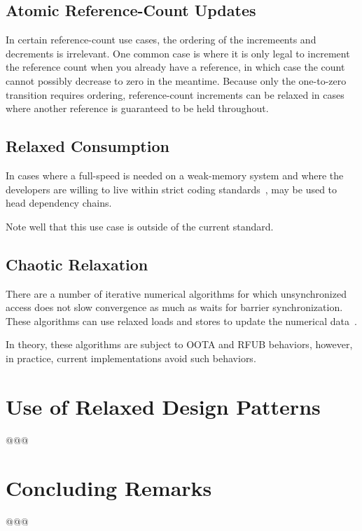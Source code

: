 \documentclass{article}
\begin{document}
\subsection{Atomic Reference-Count Updates}
\label{sec:Atomic Reference-Count Updates}

In certain reference-count use cases, the ordering of the incremeents and
decrements is irrelevant.
One common case is where it is only legal to increment the reference
count when you already have a reference, in which case the count cannot
possibly decrease to zero in the meantime.
Because only the one-to-zero transition requires ordering, reference-count
increments can be relaxed in cases where another reference is guaranteed
to be held throughout.

\subsection{Relaxed Consumption}
\label{sec:Relaxed Consumption}

In cases where a full-speed  is needed on a
weak-memory system and where the developers are willing to live within
strict coding standards~\cite{PaulEMcKenney2014rcu-dereference},
 may be used to head dependency chains.

Note well that this use case is outside of the current standard.

\subsection{Chaotic Relaxation}
\label{sec:Chaotic Relaxation}

There are a number of iterative numerical algorithms for which unsynchronized
access does not slow convergence as much as waits for barrier synchronization.
These algorithms can use relaxed loads and stores to update the numerical
data~\cite{Andrews91textbook}.

In theory, these algorithms are subject to OOTA and RFUB behaviors, however,
in practice, current implementations avoid such behaviors.

\section{Use of Relaxed Design Patterns}
\label{sec:Use of Relaxed Design Patterns}

@@@

\section{Concluding Remarks}
\label{sec:Concluding Remarks}

@@@




\end{document}
